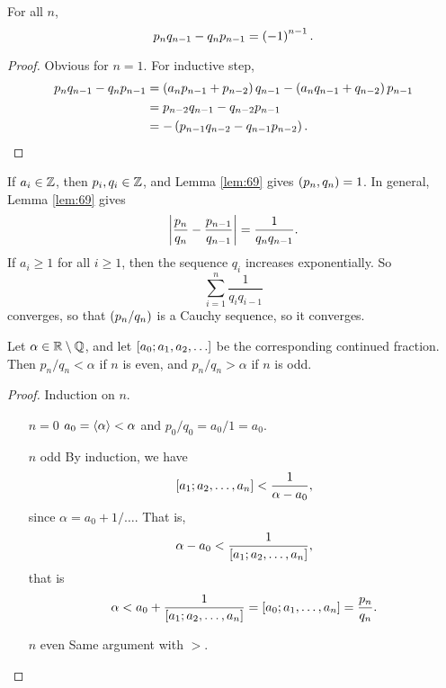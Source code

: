 \begin{lemma}
\label{lem:69}
For all $ n $,
$$ p_nq_{n - 1} - q_np_{n - 1} = \rb{-1}^{n - 1}. $$
\end{lemma}

\begin{proof}
Obvious for $ n = 1 $. For inductive step,
\begin{align*}
p_nq_{n - 1} - q_np_{n - 1}
& = \rb{a_np_{n - 1} + p_{n - 2}}q_{n - 1} - \rb{a_nq_{n - 1} + q_{n - 2}}p_{n - 1} \\
& = p_{n - 2}q_{n - 1} - q_{n - 2}p_{n - 1} \\
& = -\rb{p_{n - 1}q_{n - 2} - q_{n - 1}p_{n - 2}}.
\end{align*}
\end{proof}

\begin{note*}
If $ a_i \in \Z $, then $ p_i, q_i \in \Z $, and Lemma \ref{lem:69} gives $ \rb{p_n, q_n} = 1 $. In general, Lemma \ref{lem:69} gives
$$ \abs{\dfrac{p_n}{q_n} - \dfrac{p_{n - 1}}{q_{n - 1}}} = \dfrac{1}{q_nq_{n - 1}}. $$
If $ a_i \ge 1 $ for all $ i \ge 1 $, then the sequence $ q_i $ increases exponentially. So
$$ \sum_{i = 1}^n \dfrac{1}{q_iq_{i - 1}} $$
converges, so that $ \rb{p_n / q_n} $ is a Cauchy sequence, so it converges.
\end{note*}


\begin{lemma}
\label{lem:70}
Let $ \alpha \in \R \setminus \Q $, and let $ \sb{a_0; a_1, a_2, \dots} $ be the corresponding continued fraction. Then $ p_n / q_n < \alpha $ if $ n $ is even, and $ p_n / q_n > \alpha $ if $ n $ is odd.
\end{lemma}

\begin{proof}
Induction on $ n $.
\begin{itemize}[leftmargin=0.5in]
\item[$ n = 0 $] $ a_0 = \fb{\alpha} < \alpha $ and $ p_0 / q_0 = a_0 / 1 = a_0 $.
\item[$ n $ odd] By induction, we have
$$ \sb{a_1; a_2, \dots, a_n} < \dfrac{1}{\alpha - a_0}, $$
since $ \alpha = a_0 + 1 / \dots $. That is,
$$ \alpha - a_0 < \dfrac{1}{\sb{a_1; a_2, \dots, a_n}}, $$
that is
$$ \alpha < a_0 + \dfrac{1}{\sb{a_1; a_2, \dots, a_n}} = \sb{a_0; a_1, \dots, a_n} = \dfrac{p_n}{q_n}. $$
\item[$ n $ even] Same argument with $ > $.
\end{itemize}
\end{proof}

